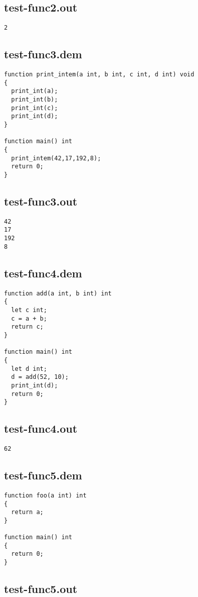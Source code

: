 \subsection{test-func2.out}
\begin{lstlisting}
2
\end{lstlisting}
\subsection{test-func3.dem}
\begin{lstlisting}
function print_intem(a int, b int, c int, d int) void
{
  print_int(a);
  print_int(b);
  print_int(c);
  print_int(d);
}

function main() int
{
  print_intem(42,17,192,8);
  return 0;
}
\end{lstlisting}
\subsection{test-func3.out}
\begin{lstlisting}
42
17
192
8
\end{lstlisting}
\subsection{test-func4.dem}
\begin{lstlisting}
function add(a int, b int) int
{
  let c int;
  c = a + b;
  return c;
}

function main() int
{
  let d int;
  d = add(52, 10);
  print_int(d);
  return 0;
}
\end{lstlisting}
\subsection{test-func4.out}
\begin{lstlisting}
62
\end{lstlisting}
\subsection{test-func5.dem}
\begin{lstlisting}
function foo(a int) int
{
  return a;
}

function main() int
{
  return 0;
}
\end{lstlisting}
\subsection{test-func5.out}
\begin{lstlisting}
\end{lstlisting}
